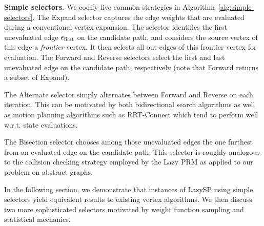 \textbf{Simple selectors.}
We codify five common strategies in
Algorithm~\ref{alg:simple-selectors}.
The Expand selector captures the edge weights that are evaluated
during a conventional vertex expansion.
The selector identifies the first unevaluated edge
$e_{\mbox{\scriptsize first}}$ on the candidate path,
and considers the source vertex of this edge a \emph{frontier} vertex.
It then selects all out-edges of this frontier vertex
for evaluation.
The Forward and Reverse selectors select the first and last
unevaluated edge on the candidate path, respectively
(note that Forward returns a subset of Expand).

The Alternate selector simply alternates between Forward
and Reverse on each iteration.
This can be motivated by both bidirectional search algorithms
as well as motion planning algorithms such as
RRT-Connect \citep{kuffner2000rrtconnect}
which tend to perform well w.r.t. state evaluations.

The Bisection selector
chooses among those unevaluated edges
the one furthest from an evaluated edge on the candidate path.
This selector is roughly analogous to the collision checking strategy
employed by the Lazy PRM \citep{bohlin2000lazyprm}
as applied to our problem on abstract graphs.

In the following section,
we demonstrate that instances of LazySP using simple selectors
yield equivalent results to existing vertex algorithms.
We then discuss two more sophisticated
selectors motivated by weight function sampling
and statistical mechanics.

